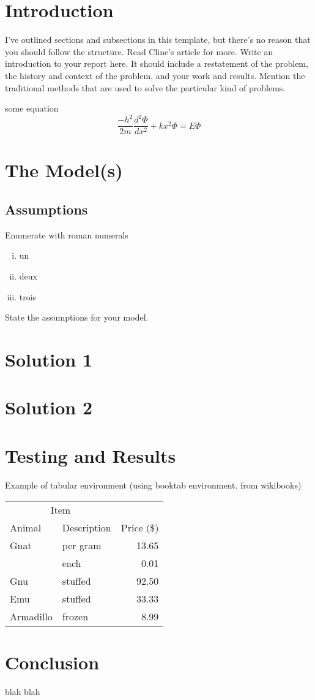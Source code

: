 \documentclass[12pt]{reedmcm}
\begin{document}
\section{Introduction}
I've outlined sections and subsections in this template, but there's no reason that you should follow the structure.
Read Cline's article for more.
Write an introduction to your report here. 
It should include a restatement of the problem, the history and context of the problem, and your work and results.
Mention the traditional methods that are used to solve the particular kind of problems.

some equation
\begin{equation*}
  \frac{−h^2}{2m} \frac{d^2\Phi}{dx^2} + kx^2\Phi = E\Phi
\end{equation*}

\section{The Model(s)}
\subsection{Assumptions}
Enumerate with roman numerals
\begin{enumerate}[(i)]
  \item un
  \item deux
  \item trois
\end{enumerate}
State the assumptions for your model.

\section{Solution 1}

\section{Solution 2}

\section{Testing and Results}

Example of tabular environment (using booktab environment. from wikibooks) 

\begin{tabular}{llr}
\toprule
\multicolumn{2}{c}{Item} \\
\cmidrule(r){1-2}
Animal    & Description & Price (\$) \\
\midrule
Gnat      & per gram    & 13.65      \\
          & each        & 0.01       \\
Gnu       & stuffed     & 92.50      \\
Emu       & stuffed     & 33.33      \\
Armadillo & frozen      & 8.99       \\
\bottomrule
\end{tabular}

\section{Conclusion}
blah blah\citep{knuth}

\renewcommand{\bibname}{References}

\nocite{*}

\end{document}
